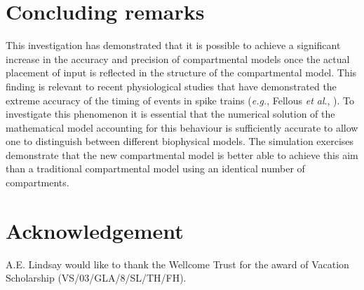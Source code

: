 
\section{Concluding remarks}
This investigation has demonstrated that it is possible to achieve
a significant increase in the accuracy and precision of
compartmental models once the actual placement of input is
reflected in the structure of the compartmental model. This
finding is relevant to recent physiological studies that have
demonstrated the extreme accuracy of the timing of events in spike
trains (\emph{e.g.}, Fellous \emph{et al}., \cite{Fellous01}). To
investigate this phenomenon it is essential that the numerical
solution of the mathematical model accounting for this behaviour
is sufficiently accurate to allow one to distinguish between
different biophysical models. The simulation exercises demonstrate
that the new compartmental model is better able to achieve this
aim than a traditional compartmental model using an identical
number of compartments.

\section*{Acknowledgement}
A.E. Lindsay would like to thank the Wellcome Trust for the award
of Vacation Scholarship (VS/03/GLA/8/SL/TH/FH).
